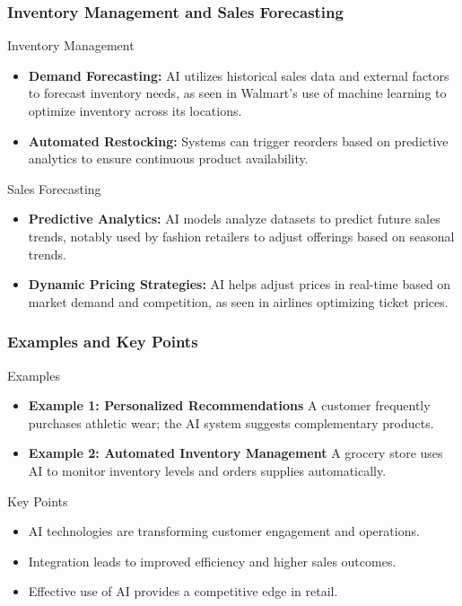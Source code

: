 \documentclass[aspectratio=169]{beamer}
\begin{document}
\begin{frame}[fragile]
    \frametitle{Inventory Management and Sales Forecasting}
    \begin{block}{Inventory Management}
        \begin{itemize}
            \item \textbf{Demand Forecasting:}
            AI utilizes historical sales data and external factors to forecast inventory needs, as seen in Walmart's use of machine learning to optimize inventory across its locations.
            \item \textbf{Automated Restocking:}
            Systems can trigger reorders based on predictive analytics to ensure continuous product availability.
        \end{itemize}
    \end{block}
    
    \begin{block}{Sales Forecasting}
        \begin{itemize}
            \item \textbf{Predictive Analytics:}
            AI models analyze datasets to predict future sales trends, notably used by fashion retailers to adjust offerings based on seasonal trends.
            \item \textbf{Dynamic Pricing Strategies:}
            AI helps adjust prices in real-time based on market demand and competition, as seen in airlines optimizing ticket prices.
        \end{itemize}
    \end{block}
\end{frame}

\begin{frame}[fragile]
    \frametitle{Examples and Key Points}
    \begin{block}{Examples}
        \begin{itemize}
            \item \textbf{Example 1: Personalized Recommendations} 
            A customer frequently purchases athletic wear; the AI system suggests complementary products.
            
            \item \textbf{Example 2: Automated Inventory Management}
            A grocery store uses AI to monitor inventory levels and orders supplies automatically.
        \end{itemize}
    \end{block}
    
    \begin{block}{Key Points}
        \begin{itemize}
            \item AI technologies are transforming customer engagement and operations.
            \item Integration leads to improved efficiency and higher sales outcomes.
            \item Effective use of AI provides a competitive edge in retail.
        \end{itemize}
    \end{block}
\end{frame}
\end{document}
